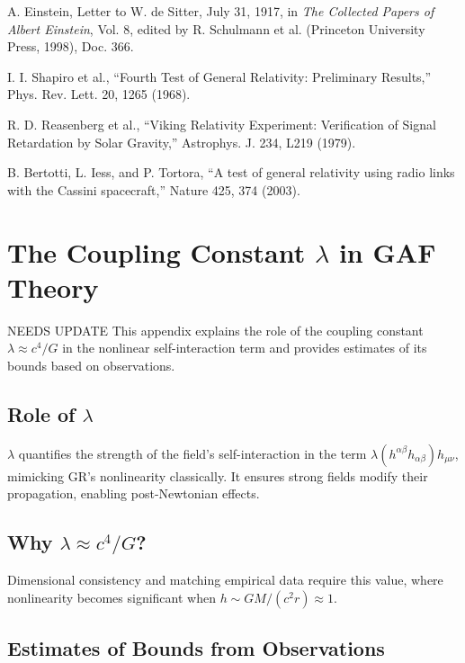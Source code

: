\documentclass{article}
\begin{document}
\begin{thebibliography}{9}
A. Einstein, Letter to W. de Sitter, July 31, 1917, in \textit{The Collected Papers of Albert Einstein}, Vol. 8, edited by R. Schulmann et al. (Princeton University Press, 1998), Doc. 366.

I. I. Shapiro et al., ``Fourth Test of General Relativity: Preliminary Results,'' Phys. Rev. Lett. 20, 1265 (1968).

R. D. Reasenberg et al., ``Viking Relativity Experiment: Verification of Signal Retardation by Solar Gravity,'' Astrophys. J. 234, L219 (1979).

B. Bertotti, L. Iess, and P. Tortora, ``A test of general relativity using radio links with the Cassini spacecraft,'' Nature 425, 374 (2003).

\end{thebibliography}

\appendix

\section{The Coupling Constant \(\lambda\) in GAF Theory}
NEEDS UPDATE
This appendix explains the role of the coupling constant \(\lambda \approx c^4 / G\) in the nonlinear self-interaction term and provides estimates of its bounds based on observations.

\subsection{Role of \(\lambda\)}

\(\lambda\) quantifies the strength of the field's self-interaction in the term \(\lambda (h^{\alpha\beta} h_{\alpha\beta}) h_{\mu\nu}\), mimicking GR's nonlinearity classically. It ensures strong fields modify their propagation, enabling post-Newtonian effects.

\subsection{Why \(\lambda \approx c^4 / G\)?}

Dimensional consistency and matching empirical data require this value, where nonlinearity becomes significant when \(h \sim GM/(c^2 r) \approx 1\).

\subsection{Estimates of Bounds from Observations}
\end{document}
